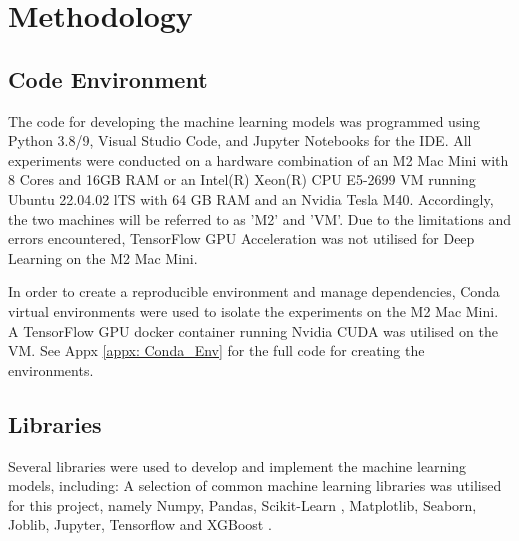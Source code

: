 
\section{Methodology}                               
\label{sec: Methodology}


\subsection{Code Environment}

The code for developing the machine learning models was programmed using Python 3.8/9, Visual Studio Code, and Jupyter Notebooks for the IDE. All experiments were conducted on a hardware combination of an M2 Mac Mini with 8 Cores and 16GB RAM or an Intel(R) Xeon(R) CPU E5-2699 VM running Ubuntu 22.04.02 lTS with 64 GB RAM and an Nvidia Tesla M40. Accordingly, the two machines will be referred to as 'M2' and 'VM'. Due to the limitations and errors encountered, TensorFlow GPU Acceleration was not utilised for Deep Learning on the M2 Mac Mini.

\medskip
In order to create a reproducible environment and manage dependencies, Conda virtual environments \parencite{anaconda} were used to isolate the experiments on the M2 Mac Mini. A TensorFlow GPU docker container running Nvidia CUDA was utilised on the VM. See Appx \ref{appx: Conda_Env} for the full code for creating the environments.

\subsection{Libraries}

Several libraries were used to develop and implement the machine learning models, including: 
A selection of common machine learning libraries was utilised for this project, namely Numpy, Pandas, Scikit-Learn \parencite{scikit-learn}, Matplotlib, Seaborn, Joblib, Jupyter, Tensorflow \parencite{tensorflow2015-whitepaper} and XGBoost \parencite{XGBoost}. 




